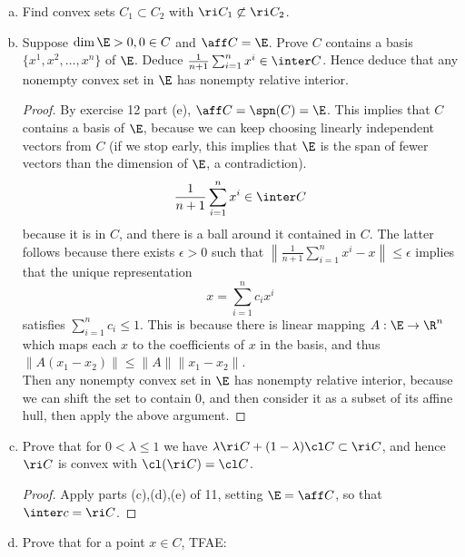 \documentclass[12pt, letterpaper]{article}
\numberwithin{equation}{subsection}
\begin{document}
\begin{enumerate}[(a)]
\item Find convex sets $C_1\subset C_2$ with $\ri C_1\not\subset\ri C_2$.
\text{}\par
{}
\item Suppose $\dim\E>0,0\in C$ and $\aff C=\E$. Prove $C$ contains 
a basis $\{x^1, x^2, \ldots, x^n\}$ of $\E$. Deduce $\frac{1}{n+1}
\sum_{i=1}^n x^i \in \inter C$. Hence deduce that any nonempty convex 
set in $\E$ has nonempty relative interior.
\begin{proof}
By exercise 12 part (e), $\aff C = \spn(C) = \E$. This implies that 
$C$ contains a basis of $\E$, because we can keep choosing linearly 
independent vectors from $C$ (if we stop early, this implies that 
$\E$ is the span of fewer vectors than the dimension of $\E$, 
a contradiction). \\
\begin{equation*}
\frac{1}{n+1}\sum_{i=1}^n x^i \in \inter C
\end{equation*}
because it is in $C$, and there is a ball around it contained in $C$. 
The latter follows because there exists $\epsilon > 0$ such that 
$\left\|\frac{1}{n+1}\sum_{i=1}^n x^i- x\right\|\leq \epsilon$ 
implies that the unique representation 
\begin{equation*}
x=\sum_{i=1}^n c_i x^i
\end{equation*}
satisfies $\sum_{i=1}^n c_i \leq 1$. This is because there is linear 
mapping $A:\E\to\R^n$ which maps each $x$ to the coefficients of 
$x$ in the basis, and thus $\|A(x_1-x_2)\|\leq \|A\|\|x_1-x_2\|$. 
\\
Then any nonempty convex set in $\E$ has nonempty relative interior, 
because we can shift the set to contain 0, and then consider it 
as a subset of its affine hull, then apply the above argument.
\end{proof}
\item Prove that for $0<\lambda \leq 1$ we have $\lambda\ri C + 
(1-\lambda)\cl C\subset \ri C$, and hence $\ri C$ is convex with $\cl
(\ri C) = \cl C$.
\begin{proof}
Apply parts (c),(d),(e) of 11, setting $\E = \aff C$, so that 
$\inter c = \ri C$.
\end{proof}
\item Prove that for a point $x\in C$, TFAE:

\end{enumerate}
\end{document}
